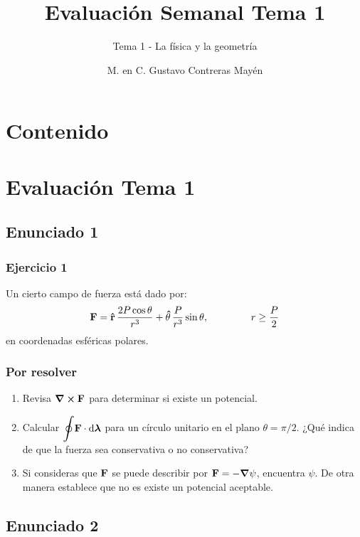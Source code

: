 \documentclass[12pt]{beamer}
\title{\large{Evaluación Semanal Tema 1}}
\subtitle{Tema 1 - La física y la geometría}
\author{M. en C. Gustavo Contreras Mayén}
\date{}
\begin{document}
\maketitle
\fontsize{14}{14}\selectfont
{}

\section*{Contenido}

\section{Evaluación Tema 1}
\subsection{Enunciado 1}

\begin{frame}
\frametitle{Ejercicio 1}
Un cierto campo de fuerza está dado por:
\begin{align*}
\vb{F} = \vu{r}\, \dfrac{2 P \cos \theta}{r^{3}} + \vu{\theta} \, \dfrac{P}{r^{3}} \sin \theta, \hspace{1.5cm} r \geq \dfrac{P}{2}
\end{align*}
en coordenadas esféricas polares.
\end{frame}
\begin{frame}
\frametitle{Por resolver}
\begin{enumerate}[<+->]
\conti
\item Revisa $\curl{\vb{F}}$ para determinar si existe un potencial.
\item Calcular $\scaleoint{6ex} \vb{F} \cdot \dd{\bm{\lambda}}$ para un círculo unitario en el plano $\theta = \pi/2$. ¿Qué indica de que la fuerza sea conservativa o no conservativa?
\item Si consideras que $\vb{F}$ se puede describir por $\vb{F} = - \grad{\psi}$, encuentra $\psi$. De otra manera establece que no es existe un potencial aceptable.
\end{enumerate}
\end{frame}

\subsection{Enunciado 2}
\end{document}
